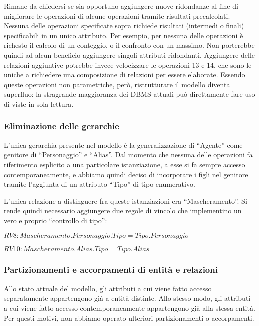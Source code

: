 \documentclass{article}
\begin{document}
Rimane da chiedersi se sia opportuno aggiungere nuove ridondanze al fine di
migliorare le operazioni di alcune operazioni tramite risultati precalcolati.
Nessuna delle operazioni specificate sopra richiede risultati (intermedi o
finali) specificabili in un unico attributo. Per esempio, per nessuna delle
operazioni è richesto il calcolo di un conteggio, o il confronto con un massimo.
Non porterebbe quindi ad alcun beneficio aggiungere singoli attributi
ridondanti. Aggiungere delle relazioni aggiuntive potrebbe invece velocizzare
le operazioni 13 e 14, che sono le uniche a richiedere una composizione di
relazioni per essere elaborate. Essendo queste operazioni non parametriche,
però, ristrutturare il modello diventa superfluo: la stragrande maggioranza dei
DBMS attuali può direttamente fare uso di viste in sola lettura.

\subsubsection{Eliminazione delle gerarchie}

L'unica gerarchia presente nel modello è la generalizzazione di ``Agente'' come
genitore di ``Personaggio'' e ``Alias''. Dal momento che nessuna delle
operazioni fa riferimento esplicito a una particolare istanziazione, a esse si
fa sempre accesso contemporaneamente, e abbiamo quindi deciso di incorporare i
figli nel genitore tramite l'aggiunta di un attributo ``Tipo'' di tipo
enumerativo.


L'unica
relazione a distinguere fra queste istanziazioni era ``Mascheramento''. Si rende
quindi necessario aggiungere due regole di vincolo che implementino un vero e
proprio ``controllo di tipo'':

\begin{math}
	RV8: Mascheramento.Personaggio.Tipo = Tipo.Personaggio
\end{math}

\begin{math}
	RV10: Mascheramento.Alias.Tipo = Tipo.Alias
\end{math}

\subsubsection{Partizionamenti e accorpamenti di entità e relazioni}

Allo stato attuale del modello, gli attributi a cui viene fatto accesso
separatamente appartengono già a entità distinte. Allo stesso modo, gli
attributi a cui viene fatto accesso contemporaneamente appartengono già alla
stessa entità. Per questi motivi, non abbiamo operato ulteriori partizionamenti
o accorpamenti.
\end{document}
